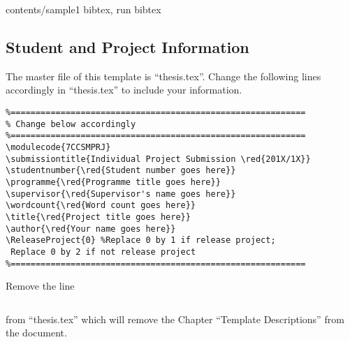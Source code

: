 contents/sample1
bibtex, run bibtex

\subsection{Student and Project Information}
	The master file of this template is ``thesis.tex''. Change the following lines accordingly in ``thesis.tex'' to include your information.

\begin{verbatim}
%===========================================================
% Change below accordingly
%===========================================================
\modulecode{7CCSMPRJ}
\submissiontitle{Individual Project Submission \red{201X/1X}}
\studentnumber{\red{Student number goes here}}
\programme{\red{Programme title goes here}}
\supervisor{\red{Supervisor's name goes here}}
\wordcount{\red{Word count goes here}}
\title{\red{Project title goes here}}
\author{\red{Your name goes here}}
\ReleaseProject{0} %Replace 0 by 1 if release project;
 Replace 0 by 2 if not release project
%===========================================================
\end{verbatim}

	Remove the line \begin{verbatim} \end{verbatim} from ``thesis.tex'' which will remove the Chapter ``Template Descriptions'' from the document.